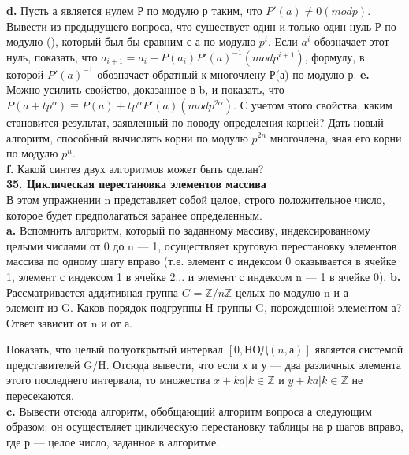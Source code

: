 \textbf{d.} Пусть а является нулем Р по модулю р таким, что $P'(a) \neq 0 (mod p)$. Вывести из предыдущего вопроса, что существует один и только один нуль Р по модулю (), который был бы сравним с а по модулю $p^{i}$. Если $a^{i}$ обозначает этот нуль, показать, что $a_{i+1} = a_{i} - P(a_{i})P'(a)^{-1} (mod p^{i+1})$, формулу, в которой $P'(a)^{-1}$ обозначает обратный к многочлену Р(а) по модулю р.\newline
\textbf{e.} Можно усилить свойство, доказанное в b, и показать, что $P(a + tp^{\alpha}) \equiv P(a) + tp^{\alpha}P'(a) (mod p^{2\alpha})$. С учетом этого свойства, каким становится результат, заявленный по поводу определения корней? Дать новый алгоритм, способный вычислять корни по модулю $p^{2n}$ многочлена, зная его корни по модулю $p^{n}$.\\

\textbf{f.} Какой синтез двух алгоритмов может быть сделан?\\

\noindent
\textbf{35. Циклическая перестановка элементов массива}\\

В этом упражнении n представляет собой целое, строго положительное число, которое будет предполагаться заранее определенным.\\

\textbf{a.} Вспомнить алгоритм, который по заданному массиву, индексированному целыми числами от 0 до n — 1, осуществляет круговую перестановку элементов массива по одному шагу вправо (т.е. элемент с индексом 0 оказывается в ячейке 1, элемент с индексом 1 в ячейке 2... и элемент с индексом n — 1 в ячейке 0).\newline
\hspace*{15pt}\textbf{b.} Рассматривается аддитивная группа $G = \mathbb{Z} / n\mathbb{Z}$  целых по модулю n и а — элемент из G. Каков порядок подгруппы Н группы G, порожденной элементом а? Ответ зависит от n и от а.
\newpage

Показать, что целый полуоткрытый интервал $[0, НОД(n,а)]$ является системой представителей G/H. Отсюда вывести, что если х и у — два различных элемента этого последнего интервала, то множества ${x + ka| k \in \mathbb{Z}}$ и ${y + ka| k \in \mathbb{Z}}$ не пересекаются.\\

\textbf{c.} Вывести отсюда алгоритм, обобщающий алгоритм вопроса а следующим образом: он осуществляет циклическую перестановку таблицы на р шагов вправо, где р — целое число, заданное в алгоритме.\\

